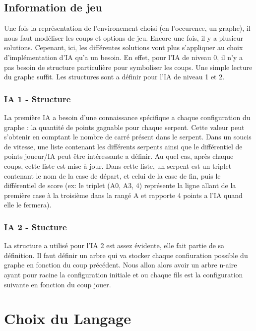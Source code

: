 \documentclass[a4paper,12pt]{report}
\begin{document}
\chapter{Information de jeu}

Une fois la repr\'esentation de l'environement choisi (en l'occurence, un graphe), il nous faut mod\'eliser les coups et options de jeu. Encore une fois, il y a plusieur solutions. Cepenant, ici, les diff\'erentes solutions vont plus s'appliquer au choix d'impl\'ementation d'IA qu'a un besoin. En effet, pour l'IA de niveau 0, il n'y a pas besoin de structure particuli\`ere pour symboliser les coups. Une simple lecture du graphe suffit. Les structures sont a d\'efinir pour l'IA de niveau 1 et 2. 

\section{IA 1 - Structure}

La premi\`ere IA a besoin d'une connaissance sp\'ecifique a chaque configuration du graphe : la quantit\'e de points gagnable pour chaque serpent. Cette valeur peut s'obtenir en comptant le nombre de carr\'e pr\'esent dans le serpent. Dans un soucis de vitesse, une liste contenant les diff\'erents serpents ainsi que le diff\'erentiel de points joueur/IA peut \^etre int\'eressante a d\'efinir. Au quel cas, apr\`es chaque coups, cette liste est mise \`a jour. Dans cette liste, un serpent est un triplet contenant le nom de la case de d\'epart, et celui de la case de fin, puis le diff\'erentiel de score (ex: le triplet (A0, A3, 4) repr\'esente la ligne allant de la premi\`ere case \`a la troisi\`eme dans la rang\'e A et rapporte 4 points a l'IA quand elle le fermera).

\section{IA 2 - Stucture}

La structure a utilis\'e pour l'IA 2 est assez \'evidente, elle fait partie de sa d\'efinition. Il faut d\'efinir un arbre qui va stocker chaque confiuration possible du graphe en fonction du coup pr\'ec\'edent. Nous allon alors avoir un arbre n-aire ayant pour racine la configuration initiale et ou chaque fils est la configuration suivante en fonction du coup jouer. 


\part{Choix du Langage}
\end{document}
